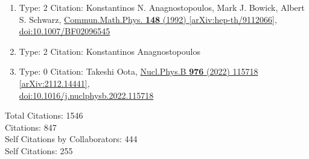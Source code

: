 \documentclass[a4paper,10pt]{article}
\begin{document}
\begin{enumerate}
\begin{enumerate}
  \item Type: 2 Citation: Konstantinos N. Anagnostopoulos, Mark J. Bowick, Albert S. Schwarz, \href{https://www.doi.org/10.1007/BF02096545}{Commun.Math.Phys. {\bf 148} (1992) }  \href{https://arxiv.org/abs/hep-th/9112066}{[arXiv:hep-th/9112066]},\\\href{https://www.doi.org/10.1007/BF02096545}{doi:10.1007/BF02096545}
  \item Type: 2 Citation: Konstantinos Anagnostopoulos
  \item Type: 0 Citation: Takeshi Oota, \href{https://www.doi.org/10.1016/j.nuclphysb.2022.115718}{Nucl.Phys.B {\bf 976} (2022) 115718}  \href{https://arxiv.org/abs/2112.14441}{[arXiv:2112.14441]},\\\href{https://www.doi.org/10.1016/j.nuclphysb.2022.115718}{doi:10.1016/j.nuclphysb.2022.115718}
\end{enumerate}

Total Citations:                       1546 \\
Citations:                             847   \\
Self Citations by Collaborators:       444   \\
Self Citations:                        255   \\


\end{enumerate}
\end{document}
